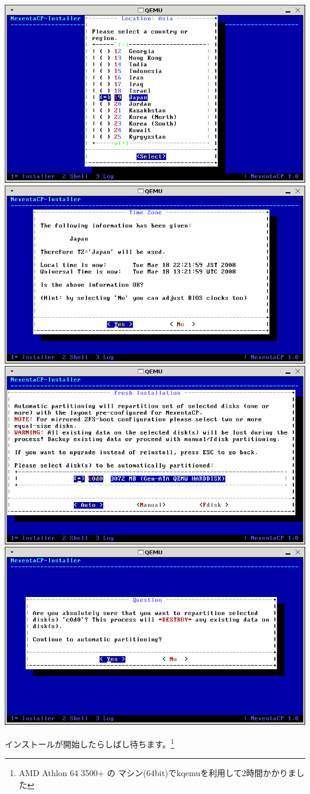 \documentclass[mingoth,a4paper]{jsarticle}
\begin{document}
\includegraphics[width=0.5\hsize]{image200804/nexenta5.png}
\includegraphics[width=0.5\hsize]{image200804/nexenta6.png}
\includegraphics[width=0.5\hsize]{image200804/nexenta7.png}
\includegraphics[width=0.5\hsize]{image200804/nexenta8.png}

インストールが開始したらしばし待ちます。\footnote{AMD Athlon 64 3500+ の
マシン(64bit)でkqemuを利用して2時間かかりました}
\end{document}
